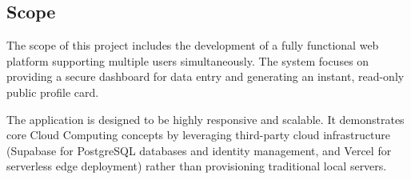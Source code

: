 \documentclass[12pt,a4paper]{report}     %
\begin{document}
\begin{normalsize}
\section{Scope}

The scope of this project includes the development of a fully functional web platform supporting multiple users simultaneously. The system focuses on providing a secure dashboard for data entry and generating an instant, read-only public profile card. 

The application is designed to be highly responsive and scalable. It demonstrates core Cloud Computing concepts by leveraging third-party cloud infrastructure (Supabase for PostgreSQL databases and identity management, and Vercel for serverless edge deployment) rather than provisioning traditional local servers.

\end{normalsize}
\end{document}
